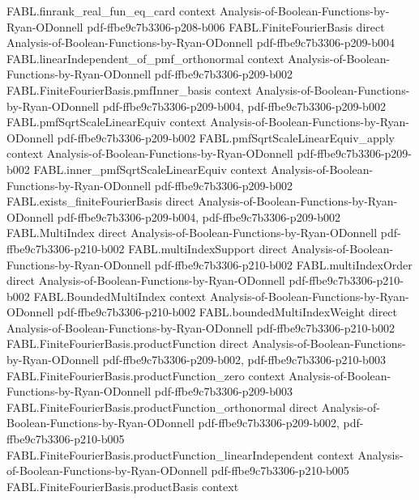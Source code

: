 \begin{theorem}
\proofstep
  {FABL.finrank_real_fun_eq_card}
  {context}
  {Analysis-of-Boolean-Functions-by-Ryan-ODonnell}
  {pdf-ffbe9c7b3306-p208-b006}
\proofstep
  {FABL.FiniteFourierBasis}
  {direct}
  {Analysis-of-Boolean-Functions-by-Ryan-ODonnell}
  {pdf-ffbe9c7b3306-p209-b004}
\proofstep
  {FABL.linearIndependent_of_pmf_orthonormal}
  {context}
  {Analysis-of-Boolean-Functions-by-Ryan-ODonnell}
  {pdf-ffbe9c7b3306-p209-b002}
\proofstep
  {FABL.FiniteFourierBasis.pmfInner_basis}
  {context}
  {Analysis-of-Boolean-Functions-by-Ryan-ODonnell}
  {pdf-ffbe9c7b3306-p209-b004,
    pdf-ffbe9c7b3306-p209-b002}
\proofstep
  {FABL.pmfSqrtScaleLinearEquiv}
  {context}
  {Analysis-of-Boolean-Functions-by-Ryan-ODonnell}
  {pdf-ffbe9c7b3306-p209-b002}
\proofstep
  {FABL.pmfSqrtScaleLinearEquiv_apply}
  {context}
  {Analysis-of-Boolean-Functions-by-Ryan-ODonnell}
  {pdf-ffbe9c7b3306-p209-b002}
\proofstep
  {FABL.inner_pmfSqrtScaleLinearEquiv}
  {context}
  {Analysis-of-Boolean-Functions-by-Ryan-ODonnell}
  {pdf-ffbe9c7b3306-p209-b002}
\proofstep
  {FABL.exists_finiteFourierBasis}
  {direct}
  {Analysis-of-Boolean-Functions-by-Ryan-ODonnell}
  {pdf-ffbe9c7b3306-p209-b004,
    pdf-ffbe9c7b3306-p209-b002}
\proofstep
  {FABL.MultiIndex}
  {direct}
  {Analysis-of-Boolean-Functions-by-Ryan-ODonnell}
  {pdf-ffbe9c7b3306-p210-b002}
\proofstep
  {FABL.multiIndexSupport}
  {direct}
  {Analysis-of-Boolean-Functions-by-Ryan-ODonnell}
  {pdf-ffbe9c7b3306-p210-b002}
\proofstep
  {FABL.multiIndexOrder}
  {direct}
  {Analysis-of-Boolean-Functions-by-Ryan-ODonnell}
  {pdf-ffbe9c7b3306-p210-b002}
\proofstep
  {FABL.BoundedMultiIndex}
  {context}
  {Analysis-of-Boolean-Functions-by-Ryan-ODonnell}
  {pdf-ffbe9c7b3306-p210-b002}
\proofstep
  {FABL.boundedMultiIndexWeight}
  {direct}
  {Analysis-of-Boolean-Functions-by-Ryan-ODonnell}
  {pdf-ffbe9c7b3306-p210-b002}
\proofstep
  {FABL.FiniteFourierBasis.productFunction}
  {direct}
  {Analysis-of-Boolean-Functions-by-Ryan-ODonnell}
  {pdf-ffbe9c7b3306-p209-b002,
    pdf-ffbe9c7b3306-p210-b003}
\proofstep
  {FABL.FiniteFourierBasis.productFunction_zero}
  {context}
  {Analysis-of-Boolean-Functions-by-Ryan-ODonnell}
  {pdf-ffbe9c7b3306-p209-b003}
\proofstep
  {FABL.FiniteFourierBasis.productFunction_orthonormal}
  {direct}
  {Analysis-of-Boolean-Functions-by-Ryan-ODonnell}
  {pdf-ffbe9c7b3306-p209-b002,
    pdf-ffbe9c7b3306-p210-b005}
\proofstep
  {FABL.FiniteFourierBasis.productFunction_linearIndependent}
  {context}
  {Analysis-of-Boolean-Functions-by-Ryan-ODonnell}
  {pdf-ffbe9c7b3306-p210-b005}
\proofstep
  {FABL.FiniteFourierBasis.productBasis}
  {context}

\end{theorem}
